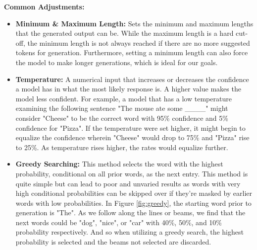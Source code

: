 \documentclass[12pt]{report}
\begin{document}
        \textbf{Common Adjustments:}
        
        \begin{itemize}
            \item \textbf{Minimum \& Maximum Length:} Sets the minimum and maximum lengths that the generated output can be. While the maximum length is a hard cut-off, the minimum length is not always reached if there are no more suggested tokens for generation. Furthermore, setting a minimum length can also force the model to make longer generations, which is ideal for our goals.
            
            \item \textbf{Temperature:} A numerical input that increases or decreases the confidence a model has in what the most likely response is. A higher value makes the model less confident. For example, a model that has a low temperature examining the following sentence "The mouse ate some \_\_\_\_" might consider "Cheese" to be the correct word with 95\% confidence and 5\% confidence for "Pizza". If the temperature were set higher, it might begin to equalize the confidence wherein "Cheese" would drop to 75\% and "Pizza" rise to 25\%. As temperature rises higher, the rates would equalize further.
            
            \newpage
            
            \item \textbf{Greedy Searching:} This method selects the word with the highest probability, conditional on all prior words, as the next entry. This method is quite simple but can lead to poor and unvaried results as words with very high conditional probabilities can be skipped over if they're masked by earlier words with low probabilities. In Figure \ref{fig:greedy}, the starting word prior to generation is "The". As we follow along the lines or beams, we find that the next words could be "dog", "nice", or "car" with 40\%, 50\%, and 10\% probability respectively. And so when utilizing a greedy search, the highest probability is selected and the beams not selected are discarded.
            

\end{itemize}
\end{document}
